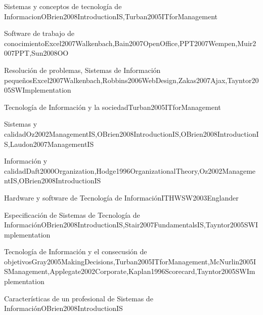 \begin{LU1}{Sistemas y conceptos de tecnología de Informacion}{OBrien2008IntroductionIS,Turban2005ITforManagement}{}
\begin{LU2}{Software de trabajo de conocimiento}{Excel2007Walkenbach,Bain2007OpenOffice,PPT2007Wempen,Muir2007PPT,Sun2008OO}{}
\begin{LU3}{Resolución de problemas, Sistemas de Información pequeños}{Excel2007Walkenbach,Robbins2006WebDesign,Zakas2007Ajax,Tayntor2005SWImplementation}{}
\begin{LU4}{Tecnología de Información y la sociedad}{Turban2005ITforManagement}{}
\begin{LU5}{Sistemas y calidad}{Oz2002ManagementIS,OBrien2008IntroductionIS,OBrien2008IntroductionIS,Laudon2007ManagementIS}{}
\begin{LU6}{Información y calidad}{Daft2000Organization,Hodge1996OrganizationalTheory,Oz2002ManagementIS,OBrien2008IntroductionIS}{}
\begin{LU7}{Hardware y software de Tecnología de Información}{ITHWSW2003Englander}{}
\begin{LU8}{Especificación de Sistemas de Tecnología de Información}{OBrien2008IntroductionIS,Stair2007FundamentalsIS,Tayntor2005SWImplementation}{}
\begin{LU9}{Tecnología de Información y el consecusión de objetivos}{Gray2005MakingDecisions,Turban2005ITforManagement,McNurlin2005ISManagement,Applegate2002Corporate,Kaplan1996Scorecard,Tayntor2005SWImplementation}{}
\begin{LU10}{Características de un profesional de Sistemas de Información}{OBrien2008IntroductionIS}{}
    
\end{LU10}
\end{LU9}
\end{LU8}
\end{LU7}
\end{LU6}
\end{LU5}
\end{LU4}
\end{LU3}
\end{LU2}
\end{LU1}
